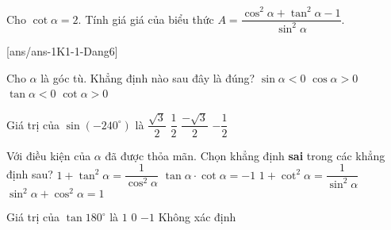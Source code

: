 \begin{bt}%
	Cho $\cot \alpha =2$. Tính giá giá của biểu thức $A=\dfrac{\cos^2 \alpha+\tan^2 \alpha-1}{\sin^2 \alpha }$.
\end{bt}
\centerline{}
[ans/ans-1K1-1-Dang6]
\begin{ex}%
	Cho $\alpha$ là góc tù. Khẳng định nào sau đây là đúng?
	\choice
	{$\sin{\alpha}<0$}
	{$\cos{\alpha}>0$}
	{\True $\tan{\alpha}<0$}
	{$\cot{\alpha}>0$}
\end{ex}
\begin{ex}%
	Giá trị của $\sin{(-240^{\circ})}$ là
	\choice
	{\True$\dfrac{\sqrt{3}}{2}$}
	{$\dfrac{1}{2}$}
	{$\dfrac{-\sqrt{3}}{2}$}
	{$-\dfrac{1}{2}$}
\end{ex}
\begin{ex}%
	Với điều kiện của $\alpha$ đã được thỏa mãn. Chọn khẳng định \textbf{sai} trong các khẳng định sau?
	\choice
	{$1+\tan^2{\alpha}=\dfrac{1}{\cos^2{\alpha}}$}
	{\True$\tan{\alpha}\cdot\cot{\alpha}=-1$}
	{$1+\cot^2{\alpha}=\dfrac{1}{\sin^2{\alpha}}$}
	{$\sin^2{\alpha}+\cos^2{\alpha}=1$}
\end{ex}
\begin{ex}%
	Giá trị của $\tan{180^{\circ}}$ là
	\choice
	{$1$}
	{\True$0$}
	{$-1$}
	{Không xác định}
\end{ex}
